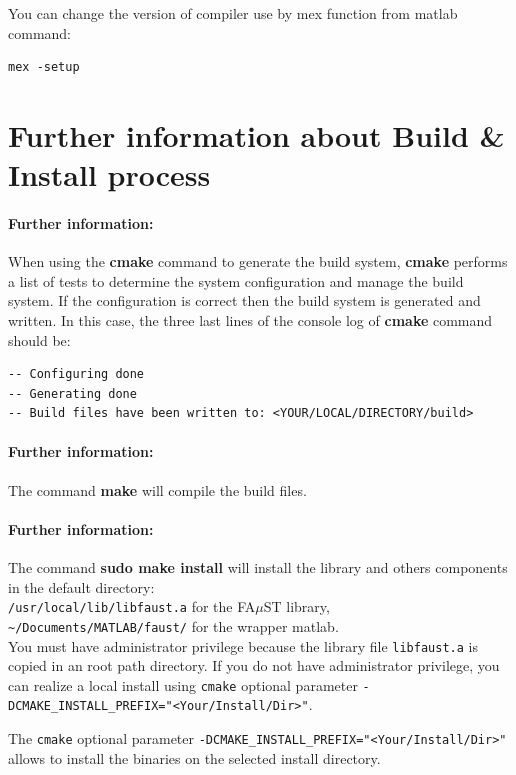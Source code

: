You can change the version of compiler use by mex function from matlab command: 
\begin{lstlisting}
mex -setup
\end{lstlisting}


\section{Further information about Build \& Install process}\label{sec:ANNEXEInfoBuildInstall}
\paragraph{Further information:}When using the \textbf{cmake} command to generate the build system, \textbf{cmake} performs a list of tests to determine the system configuration and manage the build system. If the configuration is correct then the build system is generated and written. In this case, the three last lines of the console log of \textbf{cmake} command should be:
\begin{lstlisting}
-- Configuring done 
-- Generating done 
-- Build files have been written to: <YOUR/LOCAL/DIRECTORY/build>
\end{lstlisting}

\paragraph{Further information:}The command \textbf{make} will compile the build files.

\paragraph{Further information:}The command \textbf{sudo make install} will install the library and others components in the default directory: \\
\texttt{/usr/local/lib/libfaust.a} for the FA$\mu$ST library, \\
\texttt{\textasciitilde /Documents/MATLAB/faust/} for the wrapper matlab.\\
You must have administrator privilege because the library file \texttt{libfaust.a} is copied in an root path directory. If you do not have administrator privilege, you can realize a local install using \texttt{cmake} optional parameter \texttt{-DCMAKE\_INSTALL\_PREFIX="<Your/Install/Dir>"}. 

The \texttt{cmake} optional parameter \texttt{-DCMAKE\_INSTALL\_PREFIX="<Your/Install/Dir>"} allows to install the binaries on the selected install directory. 

